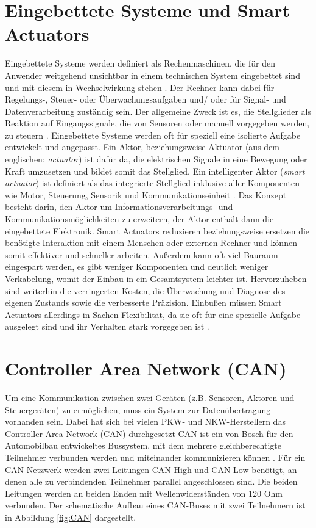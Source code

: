 \section{Eingebettete Systeme und Smart Actuators}
Eingebettete Systeme werden definiert als Rechenmaschinen, die für den Anwender weitgehend unsichtbar in einem technischen System eingebettet sind und mit diesem in Wechselwirkung stehen \cite[S.8]{Gessler2014}. Der Rechner kann dabei für Regelungs-, Steuer- oder Überwachungsaufgaben und/ oder für Signal- und Datenverarbeitung zuständig sein. Der allgemeine Zweck ist es, die Stellglieder als Reaktion auf Eingangssignale, die von Sensoren oder manuell vorgegeben werden, zu steuern \cite[S.1]{Broy2003}. Eingebettete Systeme werden oft für speziell eine isolierte Aufgabe entwickelt und angepasst.
Ein Aktor, beziehungsweise Aktuator (aus dem englischen: \textit{actuator}) ist dafür da, die elektrischen Signale in eine Bewegung oder Kraft umzusetzen und bildet somit das Stellglied. 
Ein intelligenter Aktor (\textit{smart actuator}) ist definiert als das integrierte Stellglied inklusive aller Komponenten wie Motor, Steuerung, Sensorik und Kommunikationseinheit \cite[S.442]{smartactuator}.
Das Konzept besteht darin, den Aktor um Informationsverarbeitungs- und Kommunikationsmöglichkeiten zu erweitern, der Aktor enthält dann die eingebettete Elektronik.
Smart Actuators reduzieren beziehungsweise ersetzen die benötigte Interaktion mit einem Menschen oder externen Rechner und können somit effektiver und schneller arbeiten. Außerdem kann oft viel Bauraum eingespart werden, es gibt weniger Komponenten und deutlich weniger Verkabelung, womit der Einbau in ein Gesamtsystem leichter ist. Hervorzuheben sind weiterhin die verringerten Kosten, die Überwachung und Diagnose des eigenen Zustands sowie die verbesserte Präzision. Einbußen müssen Smart Actuators allerdings in Sachen Flexibilität, da sie oft für eine spezielle Aufgabe ausgelegt sind und ihr Verhalten stark vorgegeben ist \cite[S.4]{smartaktor}.


\section{Controller Area Network (CAN)}
Um eine Kommunikation zwischen zwei Geräten (z.B. Sensoren, Aktoren und Steuergeräten) zu ermöglichen, muss ein System zur Datenübertragung vorhanden sein. Dabei hat sich bei vielen PKW- und NKW-Herstellern  das Controller Area Network (CAN) durchgesetzt \cite[S.57]{Werner2014} CAN ist ein von Bosch für den Automobilbau entwickeltes Bussystem, mit dem mehrere gleichberechtigte Teilnehmer verbunden werden und miteinander kommunizieren können \cite[S. 278]{Woern2006}.
Für ein CAN-Netzwerk werden zwei Leitungen CAN-High und CAN-Low benötigt, an denen alle zu verbindenden Teilnehmer parallel angeschlossen sind. Die beiden Leitungen werden an beiden Enden mit Wellenwiderständen von 120 Ohm verbunden. Der schematische Aufbau eines CAN-Buses mit zwei Teilnehmern ist in Abbildung \ref{fig:CAN} dargestellt. 

